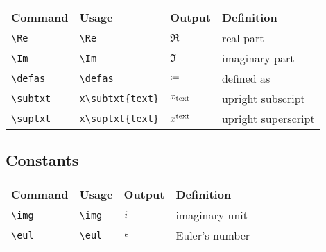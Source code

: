 \documentclass[11pt]{article}
\begin{document}
\begin{tabular}{llll}
    Command        & Usage                 & Output           & Definition          \\
    \hline
    \verb|\Re|     & \verb|\Re|            & $\Re$            & real part           \\
    \verb|\Im|     & \verb|\Im|            & $\Im$            & imaginary part      \\
    \verb|\defas|  & \verb|\defas|         & $\coloneq$         & defined as          \\
    \verb|\subtxt| & \verb|x\subtxt{text}| & $x_{\mathrm{text}}$ & upright subscript   \\
    \verb|\suptxt| & \verb|x\suptxt{text}| & $x^{\mathrm{text}}$ & upright superscript \\
\end{tabular}

\subsection{Constants}

\begin{tabular}{llll}
    Command     & Usage       & Output & Definition     \\
    \hline
    \verb|\img| & \verb|\img| & $i$ & imaginary unit \\
    \verb|\eul| & \verb|\eul| & $e$ & Euler's number \\
\end{tabular}
\end{document}
